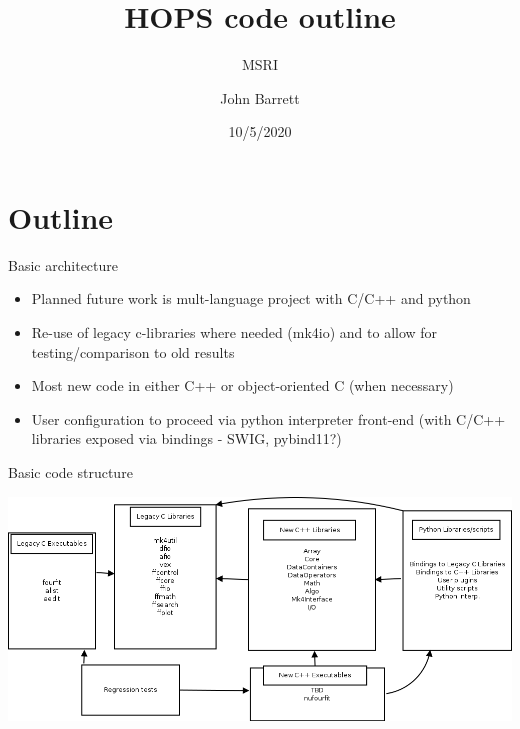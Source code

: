 \documentclass[xcolor=svgnames]{beamer}
\title[MSRI HOPS]{HOPS code outline}
\subtitle[]{MSRI}
\author[J. Barrett ]{John Barrett}
\institute[MIT]{Massachusetts Institute of Technology}
\date[10/5/2020]{10/5/2020}
\begin{document}
\section{Outline}

\begin{frame}{Basic architecture}

\begin{itemize}
 \item Planned future work is mult-language project with C/C++ and python
 \item Re-use of legacy c-libraries where needed (mk4io) and to allow for testing/comparison to old results
 \item Most new code in either C++ or object-oriented C (when necessary)
 \item User configuration to proceed via python interpreter front-end (with C/C++ libraries exposed via bindings - SWIG, pybind11?)
\end{itemize}

\end{frame}

\begin{frame}{Basic code structure}

\begin{center}
      \includegraphics[width=\textwidth]{arch_overview.png}\\
\end{center}

\end{frame}
\end{document}
